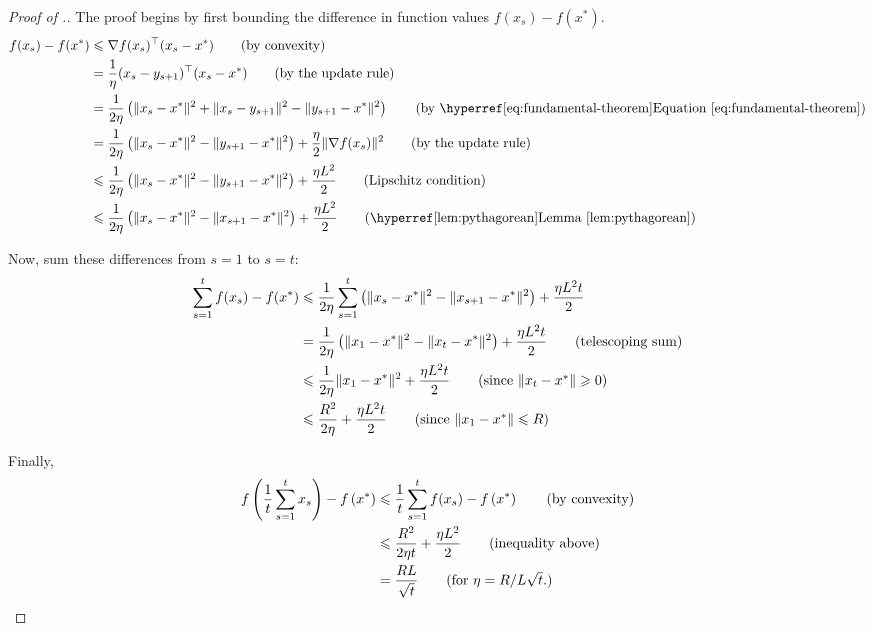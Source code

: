 \begin{proof}[Proof of .]
The proof begins by first bounding the difference in function values $f(x_s) -
f(x^*)$.
%
\begin{align}
    f(x_s) - f(x^*) &\leq \nabla f(x_s)^\trans (x_s - x^*)
\tag{by convexity}\\
    &= \frac{1}{\eta}(x_s - y_{s+1})^\trans(x_s - x^*) \tag{by the update rule} \\
    &= \frac{1}{2\eta} \left(\lVert x_s - x^* \rVert^2 + \lVert x_s - y_{s+1}
\rVert^2 - \lVert y_{s+1} - x^* \rVert^2 \right) \tag{by
\equationref{fundamental-theorem}} \\
    &= \frac{1}{2\eta} \left(\lVert x_s - x^* \rVert^2 - \lVert y_{s+1} - x^*
\rVert^2 \right) + \frac{\eta}{2} \lVert \nabla f(x_s) \rVert^2 \tag{by the
update rule} \\
    &\leq \frac{1}{2\eta} \left(\lVert x_s - x^* \rVert^2 - \lVert y_{s+1} - x^*
\rVert^2 \right) + \frac{\eta L^2}{2} \tag{Lipschitz condition} \\
    &\leq \frac{1}{2\eta} \left(\lVert x_s - x^* \rVert^2 - \lVert x_{s+1} - x^*
\rVert^2 \right) + \frac{\eta L^2}{2} \tag{\lemmaref{pythagorean}}
\end{align}

Now, sum these differences from $s=1$ to $s=t$:
\begin{align}
   \sum_{s=1}^t f(x_s) - f(x^*) &\leq  \frac{1}{2\eta} \sum_{s=1}^t \left(\lVert
x_s - x^* \rVert^2 - \lVert x_{s+1} - x^* \rVert^2 \right) + \frac{\eta L^2
t}{2} \notag \\
   &= \frac{1}{2\eta} \left(\lVert x_1 - x^* \rVert^2 - \lVert x_{t} - x^{*}
\rVert^2 \right) + \frac{\eta L^2 t}{2} \tag{telescoping sum} \\
   &\leq \frac{1}{2\eta} \lVert x_1 - x^* \rVert^2 + \frac{\eta L^2 t}{2} 
\tag{since $\|x_t-x^*\|\ge0$} \\
   &\leq \frac{R^2}{2\eta} + \frac{\eta L^2 t}{2} 
\tag{since $\|x_1-x^*\|\le R$}
\end{align}

Finally,
\begin{align*}
    f\left(\frac{1}{t}\sum_{s=1}^t x_s\right) - f\left(x^*\right)
&\leq \frac{1}{t} \sum_{s=1}^t f(x_s) - f\left(x^*\right) \tag{by convexity} \\
&\leq \frac{R^2}{2\eta t} + \frac{\eta L^2}{2} \tag{inequality above}\\
&=\frac{RL}{\sqrt{t}} \tag{for $\eta=R/L\sqrt{t}.$}
\end{align*}

\end{proof}


